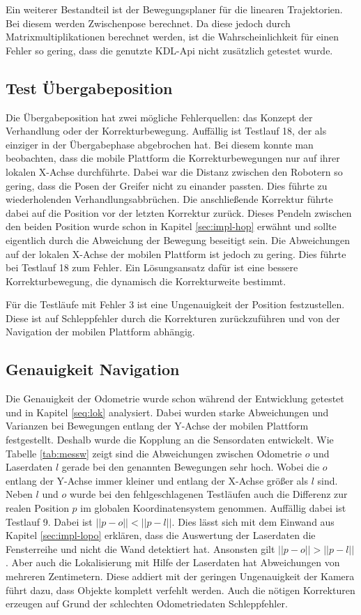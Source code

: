 Ein weiterer Bestandteil ist der Bewegungsplaner für die linearen Trajektorien. Bei diesem werden Zwischenpose berechnet. Da diese jedoch durch Matrixmultiplikationen berechnet werden, ist die Wahrscheinlichkeit für einen Fehler so gering, dass die genutzte KDL-Api nicht zusätzlich getestet wurde.
 
\subsection{Test Übergabeposition}
Die Übergabeposition hat zwei mögliche Fehlerquellen: das Konzept der Verhandlung oder der Korrekturbewegung. Auffällig ist Testlauf 18, der als einziger in der Übergabephase abgebrochen hat. Bei diesem konnte man beobachten, dass die mobile Plattform die Korrekturbewegungen nur auf ihrer lokalen X-Achse durchführte. Dabei war die Distanz zwischen den Robotern so gering, dass die Posen der Greifer nicht zu einander passten. Dies führte zu wiederholenden Verhandlungsabbrüchen. Die anschließende Korrektur führte dabei auf die Position vor der letzten Korrektur zurück. Dieses Pendeln zwischen den beiden Position wurde schon in Kapitel \ref{sec:impl-hop} erwähnt und sollte eigentlich durch die Abweichung der Bewegung beseitigt sein. Die Abweichungen auf der lokalen X-Achse der mobilen Plattform ist jedoch zu gering. Dies führte bei Testlauf 18 zum Fehler. Ein Lösungsansatz dafür ist eine bessere Korrekturbewegung, die dynamisch die Korrekturweite bestimmt.

Für die Testläufe mit Fehler 3 ist eine Ungenauigkeit der Position festzustellen. Diese ist auf Schleppfehler durch die Korrekturen zurückzuführen und von der Navigation der mobilen Plattform abhängig.

\subsection{Genauigkeit Navigation}
Die Genauigkeit der Odometrie wurde schon während der Entwicklung getestet und in Kapitel \ref{seq:lok} analysiert. Dabei wurden starke Abweichungen und Varianzen bei Bewegungen entlang der Y-Achse der mobilen Plattform festgestellt. Deshalb wurde die Kopplung an die Sensordaten entwickelt. Wie Tabelle \ref{tab:messw} zeigt sind die Abweichungen zwischen Odometrie $o$ und Laserdaten $l$ gerade bei den genannten Bewegungen sehr hoch. Wobei die $o$ entlang der Y-Achse immer kleiner und entlang der X-Achse größer als $l$ sind. Neben $l$ und $o$ wurde bei den fehlgeschlagenen Testläufen auch die Differenz zur realen Position $p$ im globalen Koordinatensystem genommen. Auffällig dabei ist Testlauf 9. Dabei ist $||p-o||<||p-l||$. Dies lässt sich mit dem Einwand aus Kapitel \ref{sec:impl-lopo} erklären, dass die Auswertung der Laserdaten die Fensterreihe und nicht die Wand detektiert hat. Ansonsten gilt $||p-o||>||p-l||$.  Aber auch die Lokalisierung mit Hilfe der Laserdaten hat Abweichungen von mehreren Zentimetern. Diese addiert mit der geringen Ungenauigkeit der Kamera führt dazu, dass Objekte komplett verfehlt werden. Auch die nötigen Korrekturen erzeugen auf Grund der schlechten Odometriedaten Schleppfehler.

